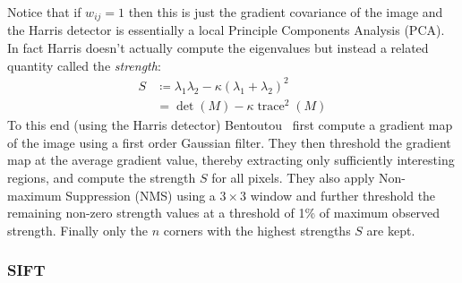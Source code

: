 Notice that if \(w_{ij} = 1\) then this is just the gradient covariance of the image and the Harris detector is essentially a local Principle Components Analysis (PCA).
%
In fact Harris doesn't actually compute the eigenvalues but instead a related quantity called the \textit{strength}:
\begin{align}
	S & \coloneqq \lambda_1 \lambda_2 - \kappa (\lambda_1 + \lambda_2)^2 \\
	  & = \det(M) - \kappa \operatorname{trace}^2(M)
	\label{eqn:strength}
\end{align}
%
To this end (using the Harris detector) Bentoutou \etal~first compute a gradient map of the image using a first order Gaussian filter.
%
They then threshold the gradient map at the average gradient value, thereby extracting only sufficiently interesting regions, and compute the strength \(S\) for all pixels.
%
They also apply Non-maximum Suppression (NMS) using a \(3 \times 3\) window and further threshold the remaining non-zero strength values at a threshold of 1\% of maximum observed strength.
%
Finally only the \(n\) corners with the highest strengths \(S\) are kept.

\subsubsection{SIFT}\label{sec:sift}

